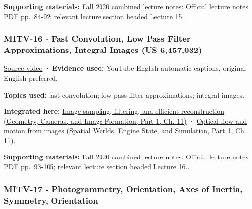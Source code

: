 \textbf{Supporting materials:} \href{https://ocw.mit.edu/courses/6-801-machine-vision-fall-2020/9ec44f69e72995c370b3797818ba01e6_MIT6_801F20_lectureNotes.pdf}{Fall 2020 combined lecture notes}: Official lecture notes PDF pp.~84-92; relevant lecture section headed Lecture 15..

\subsubsection{MITV-16 - Fast Convolution, Low Pass Filter Approximations, Integral Images (US 6,457,032)}\label{04-visual-computing-ii-ch036-mitv-16---fast-convolution-low-pass-filter-approximations-integral-images-us-6457032}

\hypertarget{04-visual-computing-ii-ch036-mitv-16---fast-convolution-low-pass-filter-approximations-integral-images-us-6457032}{}

\href{https://www.youtube.com/watch?v=tblzZhYZtvU}{Source video} · \textbf{Evidence used:} YouTube English automatic captions, original English preferred.

\textbf{Topics used:} fast convolution; low-pass filter approximations; integral images.

\textbf{Integrated here:} \href{../03-Geometry-Cameras-and-Image-Formation-P01/main.pdf\#nameddest=03-visual-computing-i-ch004-image-sampling-filtering-and-efficient-reconstruction}{Image sampling, filtering, and efficient reconstruction (Geometry, Cameras, and Image Formation, Part 1, Ch. 11)} · \href{../05-Spatial-Worlds-Engine-State-and-Simulation-P01/main.pdf\#nameddest=04-visual-computing-ii-ch030-optical-flow-and-motion-from-images}{Optical flow and motion from images (Spatial Worlds, Engine State, and Simulation, Part 1, Ch. 11)}.

\textbf{Supporting materials:} \href{https://ocw.mit.edu/courses/6-801-machine-vision-fall-2020/9ec44f69e72995c370b3797818ba01e6_MIT6_801F20_lectureNotes.pdf}{Fall 2020 combined lecture notes}: Official lecture notes PDF pp.~93-105; relevant lecture section headed Lecture 16..

\subsubsection{MITV-17 - Photogrammetry, Orientation, Axes of Inertia, Symmetry, Orientation}\label{04-visual-computing-ii-ch036-mitv-17---photogrammetry-orientation-axes-of-inertia-symmetry-orientation}

\hypertarget{04-visual-computing-ii-ch036-mitv-17---photogrammetry-orientation-axes-of-inertia-symmetry-orientation}{}

